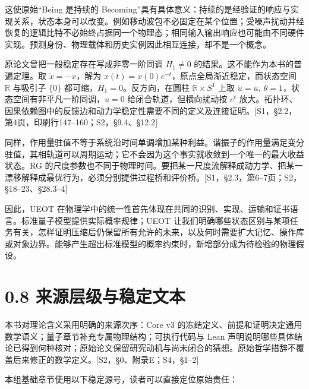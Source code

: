 \documentclass[
  11pt,
  oneside]{book}
\begin{document}
这使原始``Being 是持续的
Becoming''具有具体意义：持续的是经验证的响应与实现关系，状态本身可以改变。例如移动波包不必固定在某个位置；受噪声扰动并经恢复的逻辑比特不必始终占据同一个物理态；相同输入输出响应也可能由不同硬件实现。预测身份、物理载体和历史实例因此相互连接，却不是一个概念。

原论文曾把一般稳定存在写成非零一阶同调 \(H_1\ne0\)
的结果。这不能作为本书的普遍定理。取 \(\dot x=-x\)，解为
\(x(t)=x(0)e^{-t}\)，原点全局渐近稳定，而状态空间 \(\mathbb R\) 与吸引子
\(\{0\}\) 都可缩，\(H_1=0\)。反方向，在圆柱 \(\mathbb R\times S^1\) 上取
\(\dot u=u,\ \dot\theta=1\)，状态空间有非平凡一阶同调，\(u=0\)
给闭合轨道，但横向扰动按 \(e^t\)
放大。拓扑环、因果依赖图中的反馈边和动力学稳定性需要不同的定义及连接证明。{[}S1，§2.2，第4页，印刷行147--160；S2，§9.4、§12.2{]}

同样，作用量驻值不等于系统沿时间单调增加某种利益。谐振子的作用量满足变分驻值，其相轨道可以周期运动；它不会因为这个事实就收敛到一个唯一的最大收益状态。RG
的尺度参数也不同于物理时间。要把某一尺度流解释成动力学、把某一漂移解释成最优行为，必须分别提供过程桥和评价桥。{[}S1，§2.3，第6--7页；S2，§18--23、§28.3--4{]}

因此，UEOT
在物理学中的统一性首先体现在共同的识别、实现、运输和证书语言。标准量子模型提供实际概率规律；UEOT
让我们明确哪些状态区别与某项任务有关，怎样证明压缩后仍保留所有允许的未来，以及何时需要扩大记忆、操作库或对象边界。能够产生超出标准模型的概率约束时，新增部分成为待检验的物理假设。

\section{0.8 来源层级与稳定文本}

本书对理论含义采用明确的来源次序：Core v3
的冻结定义、前提和证明决定通用数学语义；量子章节补充专属物理结构；可执行代码与
Lean
声明说明哪些具体结论已得到何种核对；原始论文保留研究动机与尚未闭合的猜想。原始哲学措辞不覆盖后来修正的数学定义。{[}S2，§0、附录E；S4，§1--2{]}

本组基础章节使用以下稳定源号，读者可以直接定位原始责任：
\end{document}
